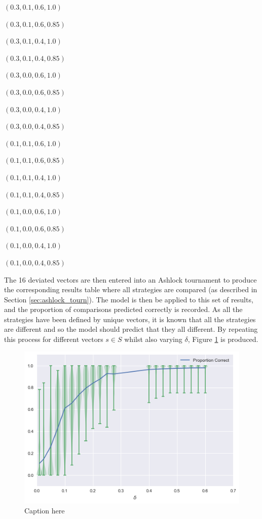 \begin{itemize}
\begin{multicols}{4}
  \item $(0.3, 0.1, 0.6, 1.0)$
  \item $(0.3, 0.1, 0.6, 0.85)$
  \item $(0.3, 0.1, 0.4, 1.0)$
  \item $(0.3, 0.1, 0.4, 0.85)$
  \item $(0.3, 0.0, 0.6, 1.0)$
  \item $(0.3, 0.0, 0.6, 0.85)$
  \item $(0.3, 0.0, 0.4, 1.0)$
  \item $(0.3, 0.0, 0.4, 0.85)$
  \item $(0.1, 0.1, 0.6, 1.0)$
  \item $(0.1, 0.1, 0.6, 0.85)$
  \item $(0.1, 0.1, 0.4, 1.0)$
  \item $(0.1, 0.1, 0.4, 0.85)$
  \item $(0.1, 0.0, 0.6, 1.0)$
  \item $(0.1, 0.0, 0.6, 0.85)$
  \item $(0.1, 0.0, 0.4, 1.0)$
  \item $(0.1, 0.0, 0.4, 0.85)$
\end{multicols}
\end{itemize}

The 16 deviated vectors are then entered into an Ashlock tournament to produce the corresponding results table where all strategies are compared (as described in Section \ref{sec:ashlock_tourn}).
The model is then be applied to this set of results, and the proportion of comparisons predicted correctly is recorded.
As all the strategies have been defined by unique vectors, it is known that all the strategies are different and so the model should predict that they all different.
By repeating this process for different vectors $s \in S$ whilst also varying $\delta$, Figure \ref{fig:m1_correct} is produced.

\begin{figure}[htbp!]
    \centering
    \includegraphics[width=\textwidth]{../img/ML/proportion-correct.png}
    \caption{Caption here}
    \label{fig:m1_correct}
\end{figure}



